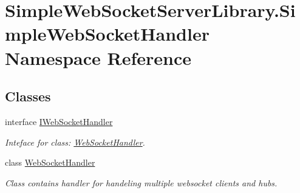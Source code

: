 \hypertarget{namespace_simple_web_socket_server_library_1_1_simple_web_socket_handler}{}\section{Simple\+Web\+Socket\+Server\+Library.\+Simple\+Web\+Socket\+Handler Namespace Reference}
\label{namespace_simple_web_socket_server_library_1_1_simple_web_socket_handler}
\subsection*{Classes}
\begin{DoxyCompactItemize}
\item 
interface \mbox{\hyperlink{interface_simple_web_socket_server_library_1_1_simple_web_socket_handler_1_1_i_web_socket_handler}{I\+Web\+Socket\+Handler}}
\begin{DoxyCompactList}\small\item\em Inteface for class\+: \mbox{\hyperlink{class_simple_web_socket_server_library_1_1_simple_web_socket_handler_1_1_web_socket_handler}{Web\+Socket\+Handler}}. \end{DoxyCompactList}\item 
class \mbox{\hyperlink{class_simple_web_socket_server_library_1_1_simple_web_socket_handler_1_1_web_socket_handler}{Web\+Socket\+Handler}}
\begin{DoxyCompactList}\small\item\em Class contains handler for handeling multiple websocket clients and hubs. \end{DoxyCompactList}\end{DoxyCompactItemize}

